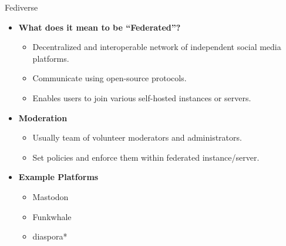 \documentclass[nobackground,dvipsnames,table]{beamer}
\begin{document}
\begin{frame}{Fediverse}

\begin{minipage}[]{0.53\textwidth}
    \small{
    \begin{itemize}
        \item \textbf{What does it mean to be “Federated”?}

        \begin{itemize}
            \item Decentralized and interoperable network of independent social media platforms.
            \item Communicate using open-source protocols. 
            \item Enables users to join various self-hosted instances or servers.
        \end{itemize}
    \end{itemize}
    }
\end{minipage}
\hfill
\begin{minipage}[]{0.46\textwidth}
    \small{
    \begin{itemize}
        \item \textbf{Moderation}

        \begin{itemize}
            \item Usually team of volunteer moderators and administrators.
            \item Set policies and enforce them within federated instance/server.
        \end{itemize}
    \end{itemize}

    \begin{itemize}
        \item \textbf{Example Platforms}

        \begin{itemize}
            \item Mastodon
            \item Funkwhale
            \item diaspora*
        \end{itemize}
    \end{itemize}
    }
\end{minipage}

\end{frame}
\end{document}
